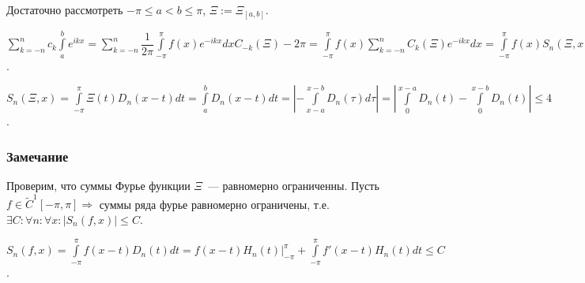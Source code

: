 \documentclass{article}
\begin{document}
            Достаточно рассмотреть $-\pi \leqslant a < b \leqslant \pi$, $\Xi := \Xi_{[a, b]}$.
            
            $\sum\limits_{k = -n}^n c_k \int\limits^b_a e^{ikx} = \sum\limits^n_{k = -n} \dfrac{1}{2 \pi} \int\limits^{\pi}_{-\pi} f(x) e^{-ikx} dx C_{-k} (\Xi) -2 \pi = \int\limits^{\pi}_{-\pi} f(x) \sum\limits_{k = -n}^n C_k(\Xi) e^{-ikx} dx = \int\limits^{\pi}_{-\pi} f(x) S_n(\Xi, x) dx = \int\limits^{\pi}_{-\pi} f(x) S_n(\Xi, x) dx \xrightarrow[n \rightarrow +\infty]{} \int\limits^b_a f(x) dx$.
            
            $S_n(\Xi, x) = \int\limits^{\pi}_{-\pi} \Xi(t) D_n(x - t) dt = \int\limits^b_a D_n(x - t) dt = \left| - \int\limits^{x - b}_{x - a} D_n(\tau) d \tau \right| = \left| \int\limits^{x - a}_0 D_n(t) - \int\limits^{x - b}_0 D_n(t) \right| \leqslant 4$.
            
        \subsubsection{Замечание}
        
            Проверим, что суммы Фурье функции $\Xi$~--- равномерно ограниченны. Пусть $f \in \widetilde{C}^1 [-\pi, \pi] \Rightarrow$ суммы ряда фурье равномерно ограничены, т.е. $\exists C : \forall n : \forall x : \left| S_n(f, x) \right| \leqslant C$.
            
            $S_n(f, x) = \int\limits^{\pi}_{-\pi} f(x - t) D_n(t) dt = f(x - t) H_n(t) \bigg|^{\pi}_{-\pi} + \int\limits^{\pi}_{-\pi} f'(x - t) H_n(t) dt \leqslant C$.
        
\end{document}
